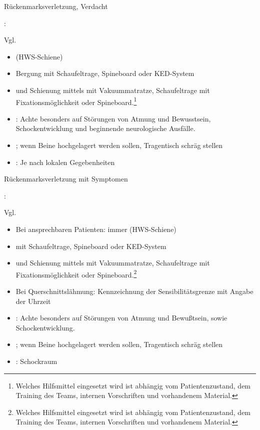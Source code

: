 {Rückenmarksverletzung, Verdacht}
{\label{m:ws-trauma-verdacht}}
{%
: 


Vgl. 
\begin{itemize}
  \item {} (HWS-Schiene)
  \item Bergung mit Schaufeltrage, Spineboard oder
  KED-System
  \item {} und Schienung mittels
  mit Vakuummatratze, Schaufeltrage mit Fixationsmöglichkeit oder
  Spineboard.\footnote{Welches Hilfsmittel
  eingesetzt wird ist abhängig vom Patientenzustand,
  dem Training des Teams, internen Vorschriften und
  vorhandenem Material.}
  \item {}: Achte besonders auf Störungen
  von Atmung und Bewusstsein, Schockentwicklung und
  beginnende neurologische Ausfälle.
  \item {}; wenn Beine
  hochgelagert werden sollen, Tragentisch
  schräg stellen
  \item {}: Je nach
  lokalen Gegebenheiten
\end{itemize}
}

{Rückenmarksverletzung mit Symptomen}
{\label{m:ws-trauma}}
{%
: 


Vgl. 
\begin{itemize}
  \item Bei ansprechbaren Patienten: immer
   (HWS-Schiene)
  \item {} mit Schaufeltrage, Spineboard oder
  KED-System
  \item {} und Schienung mittels
  mit Vakuummatratze, Schaufeltrage mit Fixationsmöglichkeit oder
  Spineboard.\footnote{Welches Hilfsmittel
  eingesetzt wird ist abhängig vom Patientenzustand,
  dem Training des Teams, internen Vorschriften und
  vorhandenem Material.}
  \item Bei Querschnittslähmung: Kennzeichnung der
  Sensibilitätsgrenze mit Angabe der Uhrzeit
  \item {}: Achte besonders auf Störungen
  von Atmung und Bewußtsein, sowie Schockentwicklung.
  \item {}; wenn Beine
  hochgelagert werden sollen, Tragentisch
  schräg stellen
  \item {}: Schockraum
\end{itemize}
}


